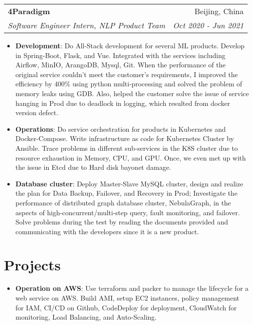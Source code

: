 \documentclass[letterpaper,11pt]{article}
\makeatletter
\newcommand{\resumeItem}[2]{
  \item\small{
    \textbf{#1}{: #2 \vspace{-2pt}}
  }
}
\newcommand{\resumeSubheading}[4]{
  \vspace{-1pt}\item
    \begin{tabular*}{0.97\textwidth}[t]{l@{\extracolsep{\fill}}r}
      \textbf{#1} & #2 \\
      \textit{\small#3} & \textit{\small #4} \\
    \end{tabular*}\vspace{-5pt}
}
\newcommand{\resumeSubItem}[2]{\resumeItem{#1}{#2}\vspace{-4pt}}
\newcommand{\resumeSubHeadingListStart}{\begin{itemize}[leftmargin=*]}
\newcommand{\resumeSubHeadingListEnd}{\end{itemize}}
\newcommand{\resumeItemListStart}{\begin{itemize}}
\newcommand{\resumeItemListEnd}{\end{itemize}\vspace{-5pt}}
\makeatother
\begin{document}
    \resumeSubheading
      {4Paradigm}{Beijing, China}
      {Software Engineer Intern, NLP Product Team}{Oct 2020 - Jun 2021}
      \resumeItemListStart
        \resumeItem{Development}
          { Do All-Stack development for several ML products. Develop in Spring-Boot, Flask, and Vue. Integrated with the services including Airflow, MinIO, ArangoDB, Mysql, Git. When the performance of the original service couldn't meet the customer's requirements, I improved the efficiency by 400\% using python multi-processing and solved the problem of memory leaks using GDB. Also, helped the customer solve the issue of service hanging in Prod due to deadlock in logging, which resulted from docker version defect. }
        \resumeItem{Operations}
          { Do service orchestration for products in Kubernetes and Docker-Compose. Write infrastructure as code for Kubernetes Cluster by Ansible. Trace problems in different sub-services in the K8S cluster due to resource exhaustion in Memory, CPU, and GPU. Once, we even met up with the issue in Etcd due to Hard disk bayonet damage. }
        \resumeItem{Database cluster}
          { Deploy Master-Slave MySQL cluster, design and realize the plan for Data Backup, Failover, and Recovery in Prod; Investigate the performance of distributed graph database cluster, NebulaGraph, in the aspects of high-concurrent/multi-step query, fault monitoring, and failover. Solve problems during the test by reading the documents provided and communicating with the developers since it is a new product. }
      \resumeItemListEnd

\section{Projects}
  \resumeSubHeadingListStart
    \resumeSubItem{Operation on AWS}
      {Use terraform and packer to manage the lifecycle for a web service on AWS. Build AMI, setup EC2 instances, policy management for IAM, CI/CD on Github, CodeDeploy for deployment, CloudWatch for monitoring, Load Balancing, and Auto-Scaling. }
  \resumeSubHeadingListEnd
\end{document}
